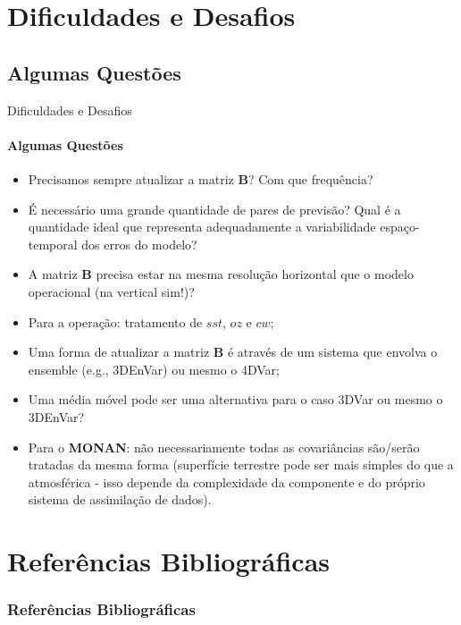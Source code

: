 \documentclass[10pt,aspectratio=169]{beamer}
\begin{document}
\section{Dificuldades e Desafios}

\subsection{Algumas Questões}

\begin{frame}{Dificuldades e Desafios}
\framesubtitle{Algumas Questões \faQuestionCircle}
    \begin{itemize}
        \item Precisamos sempre atualizar a matriz $\mathbf{B}$? Com que frequência?
        \pause
        \item É necessário uma grande quantidade de pares de previsão? Qual é a quantidade ideal que representa adequadamente a variabilidade espaço-temporal dos erros do modelo?
        \pause        
        \item A matriz $\mathbf{B}$ precisa estar na mesma resolução horizontal que o modelo operacional (na vertical sim!)?
        \pause        
        \item Para a operação: tratamento de $sst$, $oz$ e $cw$;
        \pause        
        \item Uma forma de atualizar a matriz $\mathbf{B}$ é através de um sistema que envolva o ensemble (e.g., 3DEnVar) ou mesmo o 4DVar;
        \pause        
        \item Uma média móvel pode ser uma alternativa para o caso 3DVar ou mesmo o 3DEnVar?
        \pause        
        \item Para o \textbf{MONAN}: não necessariamente todas as covariâncias são/serão tratadas da mesma forma (superfície terrestre pode ser mais simples do que a atmosférica - isso depende da complexidade da componente e do próprio sistema de assimilação de dados).
    \end{itemize}
\end{frame}

\section{Referências Bibliográficas}

\begin{frame}
\frametitle{Referências Bibliográficas}
\framesubtitle{\faBookOpen~\faCode~\faPython}
\vspace{-1.5em}
\small
\end{frame}
\end{document}
